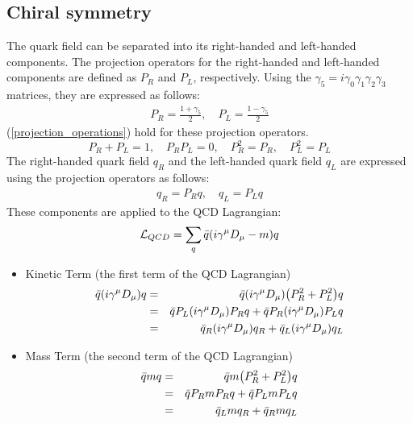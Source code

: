     \subsection{Chiral symmetry}
    \label{Intro:Chiral_symmetry}  
        The quark field can be separated into its right-handed and left-handed components. The projection operators for the right-handed and left-handed components are defined as $P_R$ and $P_L$, respectively. Using the $\gamma_5 = i \gamma_0 \gamma_1 \gamma_2 \gamma_3 $ matrices, they are expressed as follows:    
        \begin{eqnarray}
            P_R = \frac{1+\gamma_5}{2}, \quad P_L = \frac{1-\gamma_5}{2}
            \label{projection_operations}
        \end{eqnarray}
        (\ref{projection_operations}) hold for these projection operators.
        \begin{equation}
            P_R + P_L = 1, \quad P_R P_L = 0, \quad P_R^2 = P_R, \quad P_L^2 = P_L  
        \end{equation}
        The right-handed quark field $q_R$ and the left-handed quark field $q_L$ are expressed using the projection operators as follows:  
        \begin{eqnarray}  
            q_R = P_R q, \quad q_L = P_L q
        \end{eqnarray}  
        These components are applied to the QCD Lagrangian:  
        \begin{eqnarray}  
            \mathcal{L}_{QCD} = \sum_q \bar{q}\qty(i\gamma^\mu D_\mu - m)q
        \end{eqnarray}  
        
        \begin{itemize}
            \item Kinetic Term (the first term of the QCD Lagrangian)
                    \begin{eqnarray}  
                        \bar{q}\qty(i\gamma^\mu D_\mu)q &=& \bar{q}\qty(i\gamma^\mu D_\mu)\qty(P_R^2 + P_L^2)q \\  
                        &=& \bar{q} P_L \qty(i\gamma^\mu D_\mu) P_R q + \bar{q} P_R \qty(i\gamma^\mu D_\mu) P_L q \\  
                        &=& \bar{q}_R \qty(i\gamma^\mu D_\mu) q_R + \bar{q}_L \qty(i\gamma^\mu D_\mu) q_L  
                    \end{eqnarray}  
            
            \item Mass Term (the second term of the QCD Lagrangian)
                    \begin{eqnarray}  
                        \bar{q}m q &=& \bar{q} m \qty(P_R^2 + P_L^2)q \\  
                        &=& \bar{q} P_R m P_R q + \bar{q} P_L m P_L q \\  
                        &=& \bar{q}_L m q_R + \bar{q}_R m q_L
                    \end{eqnarray}  
        \end{itemize}
        
